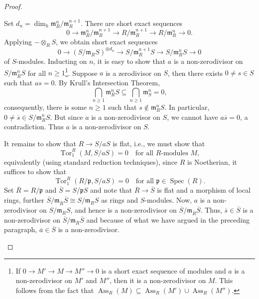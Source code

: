 \documentclass[10pt]{article}
\theoremstyle{thmstyle}
\theoremstyle{defstyle}
\newcommand{\Spec}{\operatorname{Spec}}
\newcommand{\Tor}{\operatorname{Tor}}
\newcommand{\frakm}{\mathfrak{m}} %
\newcommand{\frakp}{\mathfrak{p}} %
\renewcommand{\ge}{\geqslant}
\newcommand{\Ass}{\operatorname{Ass}}
\begin{document}
\begin{proof}
\begin{enumerate}[label=(\arabic*)]
    Set $d_n = \dim_k \frakm_R^n/\frakm_R^{n + 1}$. There are short exact sequences 
    \begin{equation*}
        0\to \frakm_R^n/\frakm_R^{n + 1}\to R/\frakm_R^{n + 1}\to R/\frakm_R^n\to 0.
    \end{equation*}
    Applying $-\otimes_R S$, we obtain short exact sequences
    \begin{equation*}
        0\to\left(S/\frakm_R S\right)^{\oplus d_n}\to S/\frakm_R^{n + 1}S\to S/\frakm_R^n S\to 0
    \end{equation*}
    of $S$-modules. Inducting on $n$, it is easy to show that $a$ is a non-zerodivisor on $S/\frakm_R^n S$ for all $n\ge 1$\footnote{If $0\to M'\to M\to M''\to 0$ is a short exact sequence of modules and $a$ is a non-zerodivisor on $M'$ and $M''$, then it is a non-zerodivisor on $M$. This follows from the fact that $\Ass_R(M)\subseteq\Ass_R(M')\cup\Ass_R(M'')$.}. Suppose $a$ is a zerodivisor on $S$, then there exists $0\ne s\in S$ such that $as = 0$. By Krull's Intersection Theorem,
    \begin{equation*}
        \bigcap_{n\ge 1}\frakm_R^n S\subseteq\bigcap_{n\ge 1}\frakm_S^n = 0,
    \end{equation*}
    consequently, there is some $n\ge 1$ such that $s\notin\frakm_R^n S$. In particular, $0\ne\overline s\in S/\frakm_R^n S$. But since $a$ is a non-zerodivisor on $S$, we cannot have $a\overline s = 0$, a contradiction. Thus $a$ is a non-zerodivisor on $S$.

    It remains to show that $R\to S/aS$ is flat, i.e., we must show that 
    \begin{equation*}
        \Tor^R_1\left(M, S/aS\right) = 0\quad\text{for all $R$-modules $M$},
    \end{equation*}
    equivalently (using standard reduction techniques), since $R$ is Noetherian, it suffices to show that 
    \begin{equation*}
        \Tor^R_1\left(R/\frakp, S/aS\right) = 0\quad\text{for all }\frakp\in\Spec(R).
    \end{equation*}
    Set $\overline R = R/\frakp$ and $\overline S = S/\frakp S$ and note that $\overline R\to \overline S$ is flat and a morphism of local rings, further $\overline S/\frakm_{\overline R}\overline S\cong S/\frakm_R S$ as rings and $S$-modules. Now, $a$ is a non-zerodivisor on $S/\frakm_R S$, and hence is a non-zerodivisor on $\overline S/\frakm_{\overline R}\overline S$. Thus, $\overline s\in\overline S$ is a non-zerodivisor on $\overline S/\frakm_{\overline R}\overline S$ and because of what we have argued in the preceding paragraph, $\overline a\in\overline S$ is a non-zerodivisor.


\end{enumerate}
\end{proof}
\end{document}

